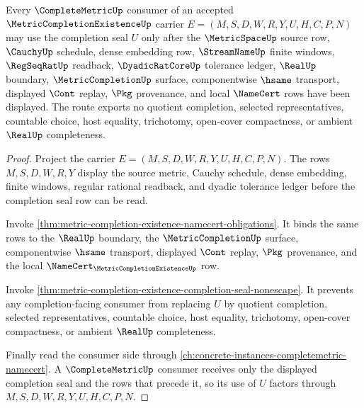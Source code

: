 \begin{theorem}
\label{thm:metric-completion-existence-complete-metric-consumer-route}
Every $\CompleteMetricUp$ consumer of an accepted $\MetricCompletionExistenceUp$ carrier $E=(M,S,D,W,R,Y,U,H,C,P,N)$ may use the completion seal $U$ only after the $\MetricSpaceUp$ source row, $\CauchyUp$ schedule, dense embedding row, $\StreamNameUp$ finite windows, $\RegSeqRatUp$ readback, $\DyadicRatCoreUp$ tolerance ledger, $\RealUp$ boundary, $\MetricCompletionUp$ surface, componentwise $\hsame$ transport, displayed $\Cont$ replay, $\Pkg$ provenance, and local $\NameCert$ rows have been displayed. The route exports no quotient completion, selected representatives, countable choice, host equality, trichotomy, open-cover compactness, or ambient $\RealUp$ completeness.
\end{theorem}
\begin{proof}
Project the carrier $E=(M,S,D,W,R,Y,U,H,C,P,N)$. The rows $M,S,D,W,R,Y$ display the source metric, Cauchy schedule, dense embedding, finite windows, regular rational readback, and dyadic tolerance ledger before the completion seal row can be read.

Invoke \autoref{thm:metric-completion-existence-namecert-obligations}. It binds the same rows to the $\RealUp$ boundary, the $\MetricCompletionUp$ surface, componentwise $\hsame$ transport, displayed $\Cont$ replay, $\Pkg$ provenance, and the local $\NameCert_{\MetricCompletionExistenceUp}$ row.

Invoke \autoref{thm:metric-completion-existence-completion-seal-nonescape}. It prevents any completion-facing consumer from replacing $U$ by quotient completion, selected representatives, countable choice, host equality, trichotomy, open-cover compactness, or ambient $\RealUp$ completeness.

Finally read the consumer side through \autoref{ch:concrete-instances-completemetric-namecert}. A $\CompleteMetricUp$ consumer receives only the displayed completion seal and the rows that precede it, so its use of $U$ factors through $M,S,D,W,R,Y,U,H,C,P,N$.
\end{proof}


